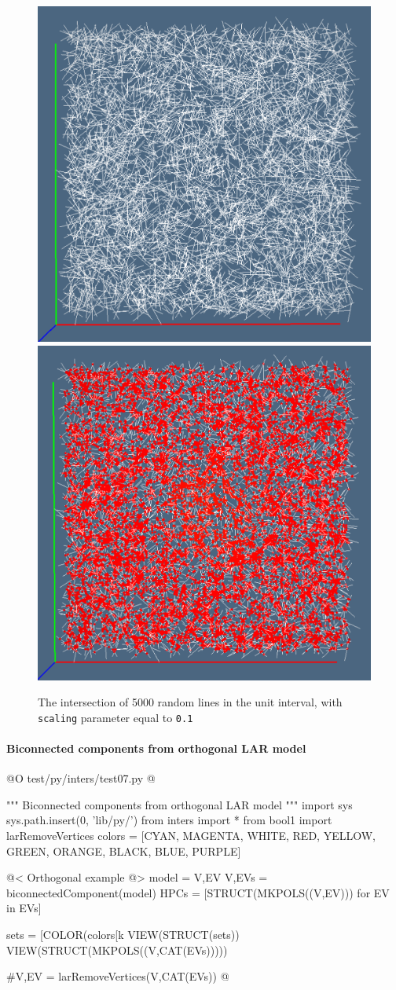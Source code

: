 \documentclass[11pt,oneside]{article}    %
\begin{document}
\begin{figure}[htbp] %
   \centering
   \includegraphics[height=0.49\linewidth,width=0.49\linewidth]{images/lineintersect1} 
   \includegraphics[height=0.49\linewidth,width=0.49\linewidth]{images/lineintersect2} 
   \caption{The intersection of 5000 random lines in the unit interval, with \texttt{scaling} parameter equal to \texttt{0.1}}
   \label{fig:example}
\end{figure}


    

\paragraph{Biconnected components from orthogonal LAR model}
@O test/py/inters/test07.py
@{""" Biconnected components from orthogonal LAR model """
import sys
sys.path.insert(0, 'lib/py/')
from inters import *
from bool1 import larRemoveVertices
colors = [CYAN, MAGENTA, WHITE, RED, YELLOW, GREEN, ORANGE, BLACK, BLUE, PURPLE]

@< Orthogonal example @>
model = V,EV
V,EVs = biconnectedComponent(model)
HPCs = [STRUCT(MKPOLS((V,EV))) for EV in EVs]

sets = [COLOR(colors[k%
VIEW(STRUCT(sets))
VIEW(STRUCT(MKPOLS((V,CAT(EVs)))))

#V,EV = larRemoveVertices(V,CAT(EVs))
@}
\end{document}
